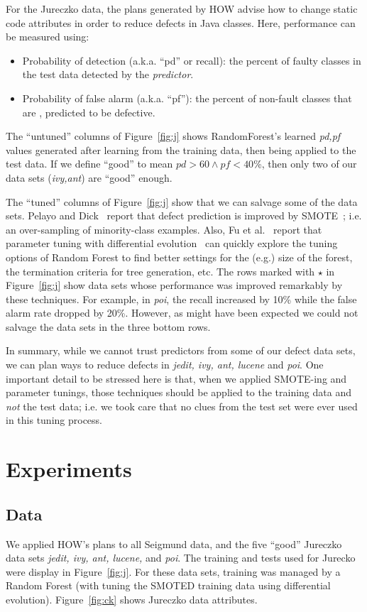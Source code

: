 \documentclass[conference]{IEEEtran}
\newcommand{\bi}{\begin{itemize}}
\newcommand{\ei}{\end{itemize}}
\newcommand{\fig}[1]{Figure~\ref{fig:#1}}
\begin{document}
For the  Jureczko   data,
the plans generated by HOW advise   how to change static code attributes in order to reduce defects in
Java classes.  Here,
performance can be measured using:
\bi
\item Probability of detection (a.k.a. ``pd'' or recall):  the percent of faulty classes in
the test data detected
by the {\em predictor}.
\item Probability of false alarm (a.k.a. ``pf''): the percent of non-fault
classes that are {\e, predicted} to be defective.
\ei 
The ``untuned'' columns of \fig{j} shows RandomForest's learned {\em pd,pf}
values generated after learning from the training data, then being applied to the test data.
If we define ``good'' to mean $\mathit{pd}>60 \wedge \mathit{pf} < 40$\%,
then only two of our data sets ({\em ivy,ant}) are ``good'' enough. 

The ``tuned'' columns of \fig{j} show that we can salvage some of the data sets.
 Pelayo and Dick~\cite{pelayo07} report that defect prediction is improved by SMOTE~\cite{Chawla2002}; i.e. an over-sampling of minority-class examples.
 Also, Fu et al.~\cite{fu:ase15} report that parameter tuning with differential evolution~\cite{storn97}
can quickly explore the tuning
options of Random Forest to find better settings for the (e.g.) size of the forest, the termination criteria
for tree generation, etc.
The rows marked with $\star$ in \fig{j} show data sets whose performance was improved remarkably by these
techniques. For example, in {\em poi}, the recall increased by 10\% while the false alarm rate dropped by 20\%.
However,  as might have been  expected
we could not salvage the data sets in the  three bottom rows.

In summary, while we cannot trust predictors from some of our defect data sets,
we can plan ways to reduce defects in {\em jedit, ivy, ant, lucene} and {\em poi}.
One important detail to be stressed here is that, when we applied    SMOTE-ing and
parameter tunings, those techniques should be applied to the training data and {\em not}
the test data;  
i.e.
we took care that no clues from the test set were ever used in this tuning process.


 

\section{Experiments}


\subsection{Data}
We applied HOW's plans to all  Seigmund data, and the five ``good''
  Jureczko   data sets {\em jedit, ivy, ant, lucene,} and {\em poi}.
  The training and tests used for Jurecko were display in \fig{j}. For these data
  sets, training was managed by a Random Forest (with tuning the SMOTED training data using differential
  evolution). \fig{ck} shows Jureczko data attributes.
  
\end{document}
